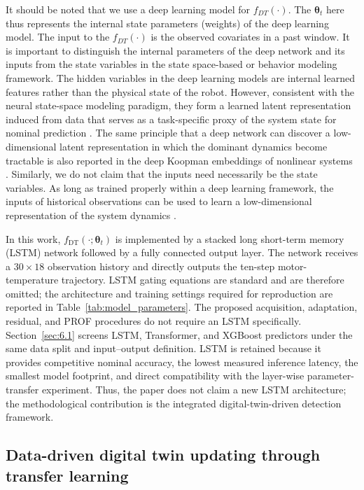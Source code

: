 \documentclass[a4paper,10pt]{cas-sc}%
\newcommand{\rev}[1]{\textcolor{revisionred}{#1}}
\newenvironment{revision}{\color{revisionred}}{}
\begin{document}
\rev{It should be noted that we use a deep learning model for $f_{DT}(\cdot)$. The $\boldsymbol{\theta}_t$ here thus represents the internal state parameters (weights) of the deep learning model. The input to the $f_{DT}(\cdot)$ is the observed covariates in a past window. It is important to distinguish the internal parameters of the deep network and its inputs from the state variables in the state space-based or behavior modeling framework. The hidden variables in the deep learning models are internal learned features rather than the physical state of the robot. However, consistent with the neural state-space modeling paradigm, they form a learned latent representation induced from data that serves as a task-specific proxy of the system state for nominal prediction \citep{revach2022kalmanet}. The same principle that a deep network can discover a low-dimensional latent representation in which the dominant dynamics become tractable is also reported in the deep Koopman embeddings of nonlinear systems \citep{lusch2018deep}. Similarly, we do not claim that the inputs need necessarily be the state variables. As long as trained properly within a deep learning framework, the inputs of historical observations can be used to learn a low-dimensional representation of the system dynamics \citep{revach2022kalmanet, lusch2018deep}.
}

\begin{revision}
	In this work, $f_{\mathrm{DT}}(\cdot;\boldsymbol{\theta}_t)$ is implemented by a stacked long short-term memory (LSTM) network followed by a fully connected output layer. The network receives a $30\times18$ observation history and directly outputs the ten-step motor-temperature trajectory. LSTM gating equations are standard and are therefore omitted; the architecture and training settings required for reproduction are reported in Table~\ref{tab:model_parameters}. The proposed acquisition, adaptation, residual, and PROF procedures do not require an LSTM specifically. Section~\ref{sec:6.1} screens LSTM, Transformer, and XGBoost predictors under the same data split and input--output definition. LSTM is retained because it provides competitive nominal accuracy, the lowest measured inference latency, the smallest model footprint, and direct compatibility with the layer-wise parameter-transfer experiment. Thus, the paper does not claim a new LSTM architecture; the methodological contribution is the integrated digital-twin-driven detection framework.
\end{revision}

\subsection{Data-driven digital twin updating through transfer learning}\label{sec:3.3}
\end{document}
